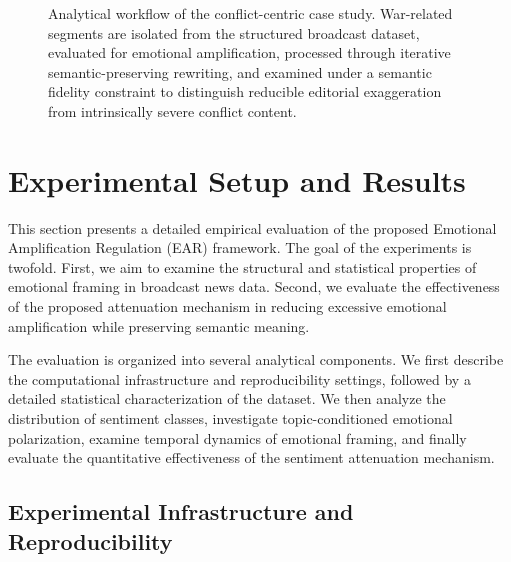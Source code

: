 \documentclass[final,1p,times]{elsarticle}
\begin{document}
\begin{figure}[t]
{
}
\caption{Analytical workflow of the conflict-centric case study. War-related segments are isolated from the structured broadcast dataset, evaluated for emotional amplification, processed through iterative semantic-preserving rewriting, and examined under a semantic fidelity constraint to distinguish reducible editorial exaggeration from intrinsically severe conflict content.}
\label{fig:case_study_framework}
\end{figure}



\section{Experimental Setup and Results}
\label{sec:experiments}

This section presents a detailed empirical evaluation of the proposed Emotional Amplification Regulation (EAR) framework. The goal of the experiments is twofold. First, we aim to examine the structural and statistical properties of emotional framing in broadcast news data. Second, we evaluate the effectiveness of the proposed attenuation mechanism in reducing excessive emotional amplification while preserving semantic meaning.

The evaluation is organized into several analytical components. We first describe the computational infrastructure and reproducibility settings, followed by a detailed statistical characterization of the dataset. We then analyze the distribution of sentiment classes, investigate topic-conditioned emotional polarization, examine temporal dynamics of emotional framing, and finally evaluate the quantitative effectiveness of the sentiment attenuation mechanism.

\subsection{Experimental Infrastructure and Reproducibility}
\end{document}
